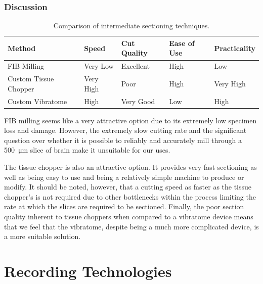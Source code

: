 \documentclass[a4paper, 11pt]{article}
\numberwithin{equation}{section}
\begin{document}
\subsubsection{Discussion}
\begin{table}[h]
	\centering
	\caption{Comparison of intermediate sectioning techniques.}
	\label{intermediate_sectioning_techniques}
	\begin{tabular}{|l|l|l|l|l|}
		\hline
		\textbf{Method}       & \textbf{Speed} & \textbf{Cut Quality} & \textbf{Ease of Use} & \textbf{Practicality} \\ \hline
		FIB Milling           & Very Low       & Excellent            & High                 & Low                   \\ \hline
		Custom Tissue Chopper & Very High      & Poor                 & High                 & Very High             \\ \hline
		Custom Vibratome      & High           & Very Good            & Low                  & High                  \\ \hline
	\end{tabular}
\end{table}

FIB milling seems like a very attractive option due to its extremely low specimen loss and damage. However, the extremely slow cutting rate and the significant question over whether it is possible to reliably and accurately mill through a \SI{500}{\micro\meter} slice of brain make it unsuitable for our uses.

The tissue chopper is also an attractive option. It provides very fast sectioning as well as being easy to use and being a relatively simple machine to produce or modify. It should be noted, however, that a cutting speed as faster as the tissue chopper's is not required due to other bottlenecks within the process limiting the rate at which the slices are required to be sectioned. Finally, the poor section quality inherent to tissue choppers when compared to a vibratome device means that we feel that the vibratome, despite being a much more complicated device, is a more suitable solution.

\newpage
\pagestyle{john}
\section{Recording Technologies}
\label{RecTec}
\end{document}
